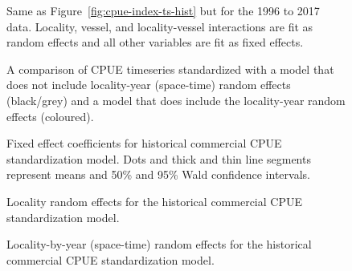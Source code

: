 \documentclass[11pt]{book}
\begin{document}
\begin{figure}[htb]

{\centering {} 

}

\caption{Same as Figure~\ref{fig:cpue-index-ts-hist} but for the 1996 to 2017 data. Locality, vessel, and locality-vessel interactions are fit as random effects and all other variables are fit as fixed effects.}\label{fig:cpue-index-ts-modern}
\end{figure}
\begin{figure}[htb]

{\centering {} 

}

\caption{A comparison of CPUE timeseries standardized with a model that does not include locality-year (space-time) random effects (black/grey) and a model that does include the locality-year random effects (coloured).}\label{fig:cpue-int-test-plot}
\end{figure}
\begin{figure}[htb]

{\centering {} 

}

\caption{Fixed effect coefficients for historical commercial CPUE standardization model. Dots and thick and thin line segments represent means and 50\% and 95\% Wald confidence intervals.}\label{fig:cpue-coef-plot1}
\end{figure}
\begin{figure}[htb]

{\centering {} 

}

\caption{Locality random effects for the historical commercial CPUE standardization model.}\label{fig:cpue-coef-plot2}
\end{figure}
\begin{figure}[htb]

{\centering {} 

}

\caption{Locality-by-year (space-time) random effects for the historical commercial CPUE standardization model.}\label{fig:cpue-coef-plot3}
\end{figure}
\end{document}
